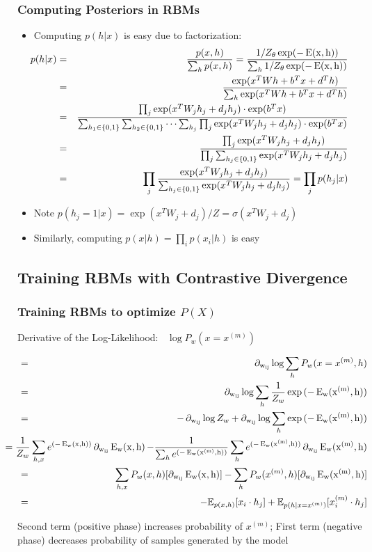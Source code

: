 \documentclass{beamer}
\DeclareMathOperator*{\Em}{E_w(x^{(m)},h)}
\DeclareMathOperator*{\E}{E_w(x,h)}
\DeclareMathOperator*{\Es}{E(x,h)}
\DeclareMathOperator*{\nw}{\partial_{w_{ij}}}
\newcommand{\bi}{\begin{itemize}}
\newcommand{\ei}{\end{itemize}}
\begin{document}
\begin{frame}
\frametitle{Computing Posteriors in RBMs}
\bi
\item Computing $p(h|x)$ is easy due to factorization:
\begin{eqnarray*} 
\hspace{-1cm}p(h|x) & = & \frac{p(x,h)}{\sum_h p(x,h)} = \frac{1/Z_\theta \exp(-\Es)}{\sum_h 1/Z_\theta \exp(-\Es)}\\
	 & = & \frac{\exp(x^T W h + b^T x + d^T h)}{\sum_h \exp(x^T W h + b^T x + d^T h)}\\
	& = &  \frac{\prod_j \exp(x^T W_j h_j +  d_j h_j)\cdot \exp(b^Tx)}{\sum_{h_1\in\{0,1\}} \sum_{h_2\in\{0,1\}}\cdots \sum_{h_j} \prod_j\exp(x^T W_j h_j +  d_j h_j)\cdot \exp(b^Tx)}\\
	& = &  \frac{  \prod_j \exp(x^T W_j h_j +  d_j h_j)}{\prod_j \sum_{h_j\in\{0,1\}}   \exp(x^T W_j h_j +  d_j h_j)}\\\
	& = & \prod_j \frac{\exp(x^T W_j h_j +  d_j h_j)}{\sum_{h_j\in\{0,1\}}   \exp(x^T W_j h_j +  d_j h_j)} = \prod_j p(h_j|x)\\
\end{eqnarray*}
\item Note $p(h_j=1|x) = \exp(x^T W_j +  d_j)/Z = \sigma(x^T W_j +  d_j)$
\pause
\item Similarly, computing $p(x|h)=\prod_i p(x_i|h)$ is easy
\ei
\end{frame}


\subsection[RBM Training]{Training RBMs with Contrastive Divergence}

\begin{frame}
\frametitle{Training RBMs to optimize $P(X)$}
Derivative of the Log-Likelihood: $\nw \log P_w(x=x^{(m)})$
\begin{small}
\begin{eqnarray}
&=& \nw \log \sum_{h} P_w(x=x^{(m)},h) \\
&=& \nw \log \sum_h \frac{1}{Z_w} \exp{(-\Em)}\\
&=& -\nw \log Z_w + \nw \log \sum_h \exp{(-\Em)}  \\
& & \hspace{-12mm} =\frac{1}{Z_w} \sum_{h,x} e^{(-\E)} \nw \E - \frac{1}{\sum_h e^{(-\Em)}} \sum_h e^{(-\Em)} \nw \Em  \nonumber \\ 
&=& \sum_{h,x} P_w(x,h) [\nw \E] - \sum_h P_w(x^{(m)},h) [\nw \Em] \\
&=& - \mathbb{E}_{p(x,h)} [ x_i \cdot h_j ] + \mathbb{E}_{p(h|x=x^{(m)})} [ x^{(m)}_i \cdot h_j ]
\end{eqnarray}
\end{small}
\pause
Second term (positive phase) increases probability of $x^{(m)}$; First term (negative phase) decreases probability of samples generated by the model
\end{frame}
\end{document}
